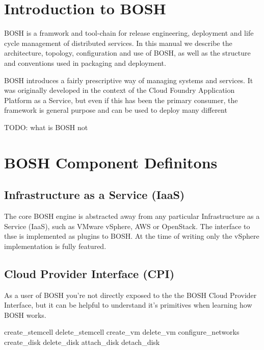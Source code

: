 
\def\mytitle{BOSH Documentation}
\def\myauthor{VMware 2012 - Cloud Foundry}
\def\latexmode{memoir}

\chapter{Introduction to BOSH}
\label{introductiontobosh}

BOSH is a framwork and tool-chain for release engineering, deployment
and life cycle management of distributed services. In this manual we
describe the architecture, topology, configuration and use of BOSH, as
well as the structure and conventions used in packaging and deployment.

BOSH introduces a fairly prescriptive way of managing systems and
services. It was originally developed in the context of the Cloud
Foundry Application Platform as a Service, but even if this has been the
primary consumer, the framework is general purpose and can be used to
deploy many different

TODO: what is BOSH not

\chapter{BOSH Component Definitons}
\label{boshcomponentdefinitons}

\section{Infrastructure as a Service (IaaS)}
\label{infrastructureasaserviceiaas}

The core BOSH engine is abstracted away from any particular
Infrastructure as a Service (IaaS), such as VMware vSphere, AWS or
OpenStack. The interface to thse is implemented as plugins to BOSH. At
the time of writing only the vSphere implementation is fully featured.

\section{Cloud Provider Interface (CPI)}
\label{cloudproviderinterfacecpi}

As a user of BOSH you're not directly exposed to the the BOSH Cloud
Provider Interface, but it can be helpful to understand it's primitives
when learning how BOSH works.

create\_stemcell
delete\_stemcell
create\_vm
delete\_vm
configure\_networks
create\_disk
delete\_disk
attach\_disk
detach\_disk

